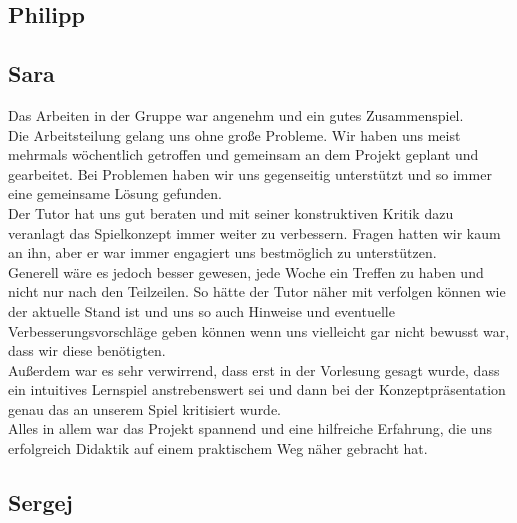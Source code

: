 \documentclass[10pt,a4paper,notitlepage]{report}
\begin{document}
	\subsection{Philipp}
	
	\subsection{Sara}
	Das Arbeiten in der Gruppe war angenehm und ein gutes Zusammenspiel.\\
	Die Arbeitsteilung gelang uns ohne große Probleme. Wir haben uns meist mehrmals wöchentlich getroffen und gemeinsam an dem Projekt geplant und gearbeitet. Bei Problemen haben wir uns gegenseitig unterstützt und so immer eine gemeinsame Lösung gefunden.\\
	Der Tutor hat uns gut beraten und mit seiner konstruktiven Kritik dazu veranlagt das Spielkonzept immer weiter zu verbessern. Fragen hatten wir kaum an ihn, aber er war immer engagiert uns bestmöglich zu unterstützen.\\
	Generell wäre es jedoch besser gewesen, jede Woche ein Treffen zu haben und nicht nur nach den Teilzeilen. So hätte der Tutor näher mit verfolgen können wie der aktuelle Stand ist und uns so auch Hinweise und eventuelle Verbesserungsvorschläge geben können wenn uns vielleicht gar nicht bewusst war, dass wir diese benötigten.\\
	Außerdem war es sehr verwirrend, dass erst in der Vorlesung gesagt wurde, dass ein intuitives Lernspiel anstrebenswert sei und dann bei der Konzeptpräsentation genau das an unserem Spiel kritisiert wurde.\\
	Alles in allem war das Projekt spannend und eine hilfreiche Erfahrung, die uns erfolgreich Didaktik auf einem praktischem Weg näher gebracht hat.\\

	\subsection{Sergej}

	\Fusszeile
\end{document}
